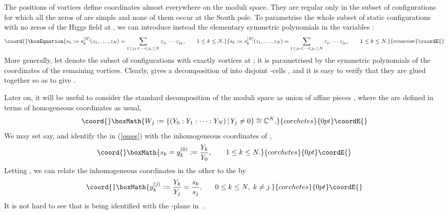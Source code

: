 \documentclass[a4paper,11pt]{article}
\begin{document}
The positions \coordHE{} of \coordHE{} vortices define coordinates
almost everywhere on the moduli space. They are regular only
in the subset of configurations for which all the zeros of \myHighlight{$\phi$}\coordHE{} 
are simple and none of them occur at the South pole. To 
parametrise the whole subset 
\coordHE{} of static configurations with no zeros of
the Higgs field at \coordHE{}, we can introduce instead the 
elementary symmetric polynomials in the \coordHE{} variables \coordHE{}:
\begin{equation}\coord{}\boxEquation{\label{esses}
s_{k}:=s_{k}^{[N]}(z_{1},\ldots,z_{N})
=\sum_{1\le j_{1}<\cdots<j_{k}\le N}z_{j_{1}}\cdots z_{j_{k}}
,\;\;\;\;\;\;\;1\le k\le N.
}{s_{k}:=s_{k}^{[N]}(z_{1},\ldots,z_{N})
=\sum_{1\le j_{1}<\cdots<j_{k}\le N}z_{j_{1}}\cdots z_{j_{k}}
,\;\;\;\;\;\;\;1\le k\le N.
}{ecuacion}\coordE{}\end{equation}
More generally, let \coordHE{} denote the subset of
configurations with exactly \coordHE{} vortices at \coordHE{}; it is
parametrised by the symmetric polynomials \coordHE{} of the 
coordinates of the \coordHE{} remaining vortices. Clearly, 
\coordHE{}
gives a decomposition of \coordHE{} into \coordHE{} disjoint \coordHE{}-cells
\coordHE{}, and it is easy to verify that they are
glued together so as to give \coordHE{}.


Later on, it will be useful to consider the standard decomposition
of the moduli space as union of affine pieces 
\coordHE{}, where the \coordHE{} are defined
in terms of homogeneous coordinates as usual,
\[\coord{}\boxMath{
W_{j}:=\{(Y_{0}:Y_{1}:\cdots:Y_{N})\,|\,Y_{j}\ne 0 \}\cong \mathbb{C}^{N}.
}{corchetes}{0pt}\coordE{}\]
We may set \coordHE{} say, and identify the \coordHE{} in
(\ref{esses}) with the inhomogeneous coordinates of \coordHE{},
\[\coord{}\boxMath{
s_{k}=y^{(0)}_{k}:=\frac{Y_{k}}{Y_{0}},\;\;\;\;\;\;\;1\le k\le N.
}{corchetes}{0pt}\coordE{}\]
Letting \coordHE{}, we can relate the inhomogeneous coordinates in the
other \coordHE{} to the \coordHE{} by
\[\coord{}\boxMath{
y_{k}^{(j)}:=\frac{Y_{k}}{Y_{j}}=\frac{s_{k}}{s_{j}},
\;\;\;\;\;\;0\le k \le N,\;k\ne j.
}{corchetes}{0pt}\coordE{}\]
It is not hard to see that \coordHE{} is being identified with the \coordHE{}-plane
\coordHE{} in~\coordHE{}.
\end{document}
